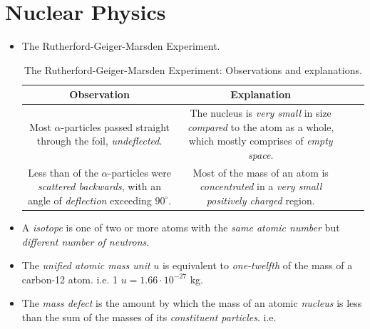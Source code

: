 \documentclass[oneside]{book}
\begin{document}
\chapter{Nuclear Physics}
\begin{itemize}
    \item The Rutherford-Geiger-Marsden Experiment.
    \begin{table}[H]
        \centering
        \begin{tabular}{ScSc}
            \toprule
            Observation & Explanation\\
            \midrule
            \begin{minipage}{0.5\textwidth-25.2pt}
                Most \(\alpha\)-particles passed straight through the foil, \emph{undeflected}.
            \end{minipage}& 
            \begin{minipage}{0.5\textwidth-25.2pt}
                The nucleus is \emph{very small} in size \emph{compared} to the atom as a whole, which mostly comprises of \emph{empty space}.
            \end{minipage}\\
            \midrule
            \begin{minipage}{0.5\textwidth-25.2pt}
                Less than  of the \(\alpha\)-particles were \emph{scattered backwards}, with an angle of \emph{deflection} exceeding \(90^\circ\).
            \end{minipage}& 
            \begin{minipage}{0.5\textwidth-25.2pt}
                Most of the mass of an atom is \emph{concentrated} in a \emph{very small positively charged} region.
            \end{minipage}\\
            \bottomrule
        \end{tabular}
        \caption{The Rutherford-Geiger-Marsden Experiment: Observations and explanations.}
        \label{table:rutherford-geiger-marsden}
    \end{table}
    \item[\AsteriskThin] A \emph{isotope} is one of two or more atoms with the \emph{same atomic number} but \emph{different number of neutrons}.
    \item[\AsteriskThin] The \emph{unified atomic mass unit} \(u\) is equivalent to \emph{one-twelfth} of the mass of a carbon-12 atom. i.e. 1 \(u=1.66\cdot 10^{-27}\) kg.
    \item[\AsteriskThin] The \emph{mass defect} is the amount by which the mass of an atomic \emph{nucleus} is less than the sum of the masses of its \emph{constituent particles}. i.e.

\end{itemize}
\end{document}
